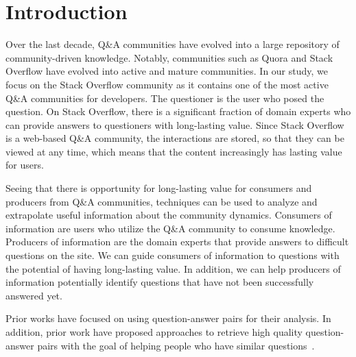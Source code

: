 \section{Introduction} Over the last decade, Q\&A communities have evolved into a large repository of community-driven knowledge. Notably, communities such as Quora and Stack Overflow have evolved into active and mature communities. In our study, we focus on the Stack Overflow community as it contains one of the most active Q\&A communities for developers. The questioner is the user who posed the question. On Stack Overflow, there is a significant fraction of domain experts who can provide answers to questioners with long-lasting value. Since Stack Overflow is a web-based Q\&A community, the interactions are stored, so that they can be viewed at any time, which means that the content increasingly has lasting value for users. 


Seeing that there is opportunity for long-lasting value for consumers and producers from Q\&A communities, techniques can be used to analyze and extrapolate useful information about the community dynamics. Consumers of information are users who utilize the Q\&A community to consume knowledge. Producers of information are the domain experts that provide answers to difficult questions on the site. We can guide consumers of information to questions with the potential of having long-lasting value. In addition, we can help producers of information potentially identify questions that have not been successfully answered yet.


Prior works have focused on using question-answer pairs for their analysis. In addition, prior work have proposed approaches to retrieve high quality question-answer pairs with the goal of helping people who have similar questions~\cite{liu2011predicting}.


